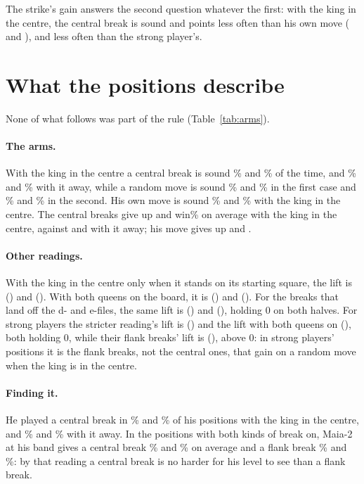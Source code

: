 \documentclass[11pt]{article}
\begin{document}
The strike's gain answers the second question whatever the first: with the king in the centre, the
central break is sound \GainFirst{} and \GainSecond{} points less often than his own move
(\GainFirstCi{} and \GainSecondCi), and \StrongGain{} less often than the strong player's.

\RuleTable

\section{What the positions describe}

None of what follows was part of the rule (Table~\ref{tab:arms}).

\paragraph{The arms.} With the king in the centre a central break is sound \CCentreFirst\% and
\CCentreSecond\% of the time, and \CAwayFirst\% and \CAwaySecond\% with it away, while a random
move is sound \RCentreFirst\% and \RCentreSecond\% in the first case and \RAwayFirst\% and
\RAwaySecond\% in the second. His own move is sound \ACentreFirst\% and \ACentreSecond\% with the
king in the centre. The central breaks give up \LostCCentreFirst{} and \LostCCentreSecond{} win\%
on average with the king in the centre, against \LostCAwayFirst{} and \LostCAwaySecond{} with it
away; his move gives up \LostACentreFirst{} and \LostACentreSecond.

\paragraph{Other readings.} With the king in the centre only when it stands on its starting square,
the lift is \StrictFirst{} (\StrictFirstCi) and \StrictSecond{} (\StrictSecondCi). With both queens
on the board, it is \QueensFirst{} (\QueensFirstCi) and \QueensSecond{} (\QueensSecondCi). For the
breaks that land off the d- and e-files, the same lift is \FlankFirst{} (\FlankFirstCi) and
\FlankSecond{} (\FlankSecondCi), holding 0 on both halves. For strong players the stricter
reading's lift is \StrongStrict{} (\StrongStrictCi) and the lift with both queens on
\StrongQueens{} (\StrongQueensCi), both holding 0, while their flank breaks' lift is
\StrongFlank{} (\StrongFlankCi), above 0: in strong players' positions it is the flank breaks,
not the central ones, that gain on a random move when the king is in the centre.

\paragraph{Finding it.} He played a central break in \PlayedCentreFirst\% and
\PlayedCentreSecond\% of his positions with the king in the centre, and \PlayedAwayFirst\% and
\PlayedAwaySecond\% with it away. In the positions with both kinds of break on, Maia-2 at his band
gives a central break \MaiaCFirst\% and \MaiaCSecond\% on average and a flank break \MaiaFFirst\%
and \MaiaFSecond\%: by that reading a central break is no harder for his level to see than a flank
break.
\end{document}
